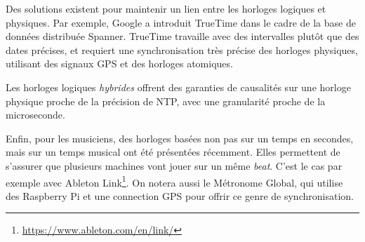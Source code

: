 \documentclass[10pt]{article}
\begin{document}
Des solutions existent pour maintenir un lien entre les horloges logiques et physiques. 
Par exemple, Google a introduit TrueTime dans le cadre de la base de données distribuée Spanner\cite{corbett2013spanner}. 
TrueTime travaille avec des intervalles plutôt que des dates précises, et requiert une synchronisation très précise des horloges physiques, utilisant des signaux GPS et des horloges atomiques.

Les horloges logiques \textit{hybrides}\cite{kulkarni2014logical} offrent des garanties de causalités sur une horloge physique proche de la précision de NTP, avec une granularité proche de la microseconde.

Enfin, pour les musiciens, des horloges basées non pas sur un temps en secondes, mais sur un temps musical ont été présentées récemment. Elles permettent de s'assurer que plusieurs machines vont jouer sur un même \textit{beat}. C'est le cas par exemple avec Ableton Link\footnote{\url{https://www.ableton.com/en/link/}}. 
On notera aussi le Métronome Global\cite{oda2016global}, qui utilise des Raspberry Pi et une connection GPS pour offrir ce genre de synchronisation.



\end{document}
